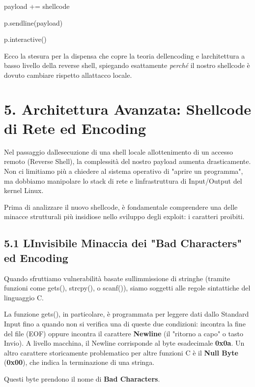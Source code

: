 \documentclass[11pt,a4paper]{article}
\begin{document}
payload += shellcode

p.sendline(payload)

p.interactive()

Ecco la stesura per la dispensa che copre la teoria
dell\textquotesingle encoding e l\textquotesingle architettura a basso
livello della reverse shell, spiegando esattamente \emph{perché} il
nostro shellcode è dovuto cambiare rispetto all\textquotesingle attacco
locale.

\section{5. Architettura Avanzata: Shellcode di Rete ed
Encoding}\label{architettura-avanzata-shellcode-di-rete-ed-encoding}

Nel passaggio dall\textquotesingle esecuzione di una shell locale
all\textquotesingle ottenimento di un accesso remoto (Reverse Shell), la
complessità del nostro payload aumenta drasticamente. Non ci limitiamo
più a chiedere al sistema operativo di "aprire un programma", ma
dobbiamo manipolare lo stack di rete e l\textquotesingle infrastruttura
di Input/Output del kernel Linux.

Prima di analizzare il nuovo shellcode, è fondamentale comprendere una
delle minacce strutturali più insidiose nello sviluppo degli exploit: i
caratteri proibiti.

\subsection{5.1 L\textquotesingle Invisibile Minaccia dei "Bad
Characters" ed
Encoding}\label{linvisibile-minaccia-dei-bad-characters-ed-encoding}

Quando sfruttiamo vulnerabilità basate sull\textquotesingle immissione
di stringhe (tramite funzioni come gets(), strcpy(), o scanf()), siamo
soggetti alle regole sintattiche del linguaggio C.

La funzione gets(), in particolare, è programmata per leggere dati dallo
Standard Input fino a quando non si verifica una di queste due
condizioni: incontra la fine del file (EOF) oppure incontra il carattere
\textbf{Newline} (il "ritorno a capo" o tasto Invio). A livello
macchina, il Newline corrisponde al byte esadecimale \textbf{0x0a}. Un
altro carattere storicamente problematico per altre funzioni C è il
\textbf{Null Byte} (\textbf{0x00}), che indica la terminazione di una
stringa.

Questi byte prendono il nome di \textbf{Bad Characters}.
\end{document}
